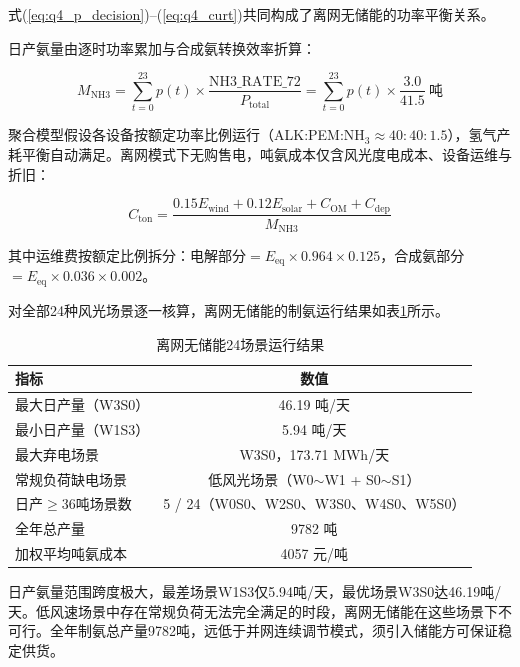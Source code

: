 \documentclass[zihao=-4,a4paper]{ctexart} %
\begin{document}
式(\ref{eq:q4_p_decision})--(\ref{eq:q4_curt})共同构成了离网无储能的功率平衡关系。

日产氨量由逐时功率累加与合成氨转换效率折算：

\begin{equation}
	M_{\text{NH3}} = \sum_{t=0}^{23} p(t) \times \frac{\text{NH3\_RATE\_72}}{P_{\text{total}}}
	= \sum_{t=0}^{23} p(t) \times \frac{3.0}{41.5}\ \text{吨}
	\label{eq:q4_prod_ns}
\end{equation}

聚合模型假设各设备按额定功率比例运行（ALK:PEM:NH$_3 \approx 40:40:1.5$），氢气产耗平衡自动满足。离网模式下无购售电，吨氨成本仅含风光度电成本、设备运维与折旧：

\begin{equation}
	C_{\text{ton}} = \frac{0.15 E_{\text{wind}} + 0.12 E_{\text{solar}} + C_{\text{OM}} + C_{\text{dep}}}{M_{\text{NH3}}}
	\label{eq:q4_cost_ns}
\end{equation}

其中运维费按额定比例拆分：电解部分$=E_{\text{eq}} \times 0.964 \times 0.125$，合成氨部分$=E_{\text{eq}} \times 0.036 \times 0.002$。

对全部24种风光场景逐一核算，离网无储能的制氨运行结果如表\ref{tab:q4_nostorage}所示。

\begin{table}[ht]
	\centering
	\small
	\caption{离网无储能24场景运行结果}
	\label{tab:q4_nostorage}
	\begin{tabular}{lc}
		\toprule
		指标 & 数值 \\
		\midrule
		最大日产量（W3S0） & 46.19 吨/天 \\
		最小日产量（W1S3） & 5.94 吨/天 \\
		最大弃电场景 & W3S0，173.71 MWh/天 \\
		常规负荷缺电场景 & 低风光场景（W0$\sim$W1 + S0$\sim$S1） \\
		日产$\ge 36$吨场景数 & 5 / 24（W0S0、W2S0、W3S0、W4S0、W5S0） \\
		全年总产量 & 9782 吨 \\
		加权平均吨氨成本 & 4057 元/吨 \\
		\bottomrule
	\end{tabular}
\end{table}

日产氨量范围跨度极大，最差场景W1S3仅5.94吨/天，最优场景W3S0达46.19吨/天。低风速场景中存在常规负荷无法完全满足的时段，离网无储能在这些场景下不可行。全年制氨总产量9782吨，远低于并网连续调节模式，须引入储能方可保证稳定供货。
\end{document}
